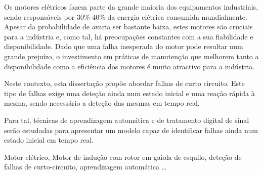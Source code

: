 Os motores elétricos fazem parte da grande maioria dos equipamentos industriais, sendo responsáveis por 30\%-40\% da energia elétrica consumida mundialmente.
Apesar da probabilidade de avaria ser bastante baixa, estes motores são cruciais para a indústria e, como tal, há preocupações constantes com a sua fiabilidade e disponibilidade.
Dado que uma falha inesperada do motor pode resultar num grande prejuízo, o investimento em práticas de manutenção  que melhorem tanto a disponibilidade como a eficiência dos motores é muito atractivo para a indústria.

Neste contexto, esta dissertação propõe abordar falhas de curto circuito. Este tipo de falhas exige uma deteção ainda num estado inicial e uma reação rápida à mesma, sendo necessário a deteção das mesmas em tempo real.

Para tal, técnicas de aprendizagem automática e de tratamento digital de sinal serão estudadas para apresentar um modelo capaz de identificar falhas ainda num estado inicial em tempo real.

\begin{keywords}
Motor elétrico, Motor de indução com rotor em gaiola de esquilo, deteção de falhas de curto-circuito, aprendizagem automática \ldots
\end{keywords}

